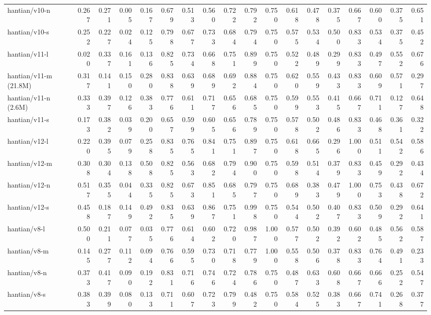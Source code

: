 \documentclass[border=2pt]{standalone}
\begin{document}
\begin{tabular}{lrrrrrrrrrrrrrrrrr}
hantian/v10-n & 0.267 & 0.271 & 0.005 & 0.167 & 0.679 & 0.513 & 0.560 & 0.722 & 0.792 & 0.750 & 0.618 & 0.478 & 0.375 & 0.667 & 0.600 & 0.375 & 0.651 \\
hantian/v10-s & 0.252 & 0.227 & 0.024 & 0.125 & 0.798 & 0.677 & 0.733 & 0.684 & 0.794 & 0.750 & 0.575 & 0.534 & 0.500 & 0.833 & 0.534 & 0.375 & 0.452 \\
hantian/v11-l & 0.020 & 0.337 & 0.161 & 0.136 & 0.825 & 0.734 & 0.668 & 0.751 & 0.899 & 0.750 & 0.522 & 0.489 & 0.299 & 0.833 & 0.497 & 0.552 & 0.676 \\
hantian/v11-m (21.8M) & 0.317 & 0.141 & 0.150 & 0.280 & 0.838 & 0.639 & 0.689 & 0.692 & 0.884 & 0.750 & 0.620 & 0.559 & 0.433 & 0.833 & 0.609 & 0.571 & 0.297 \\
hantian/v11-n (2.6M) & 0.333 & 0.397 & 0.126 & 0.383 & 0.776 & 0.611 & 0.717 & 0.656 & 0.685 & 0.750 & 0.599 & 0.553 & 0.415 & 0.667 & 0.711 & 0.127 & 0.648 \\
hantian/v11-s & 0.173 & 0.382 & 0.039 & 0.200 & 0.657 & 0.599 & 0.605 & 0.656 & 0.789 & 0.750 & 0.578 & 0.502 & 0.486 & 0.833 & 0.468 & 0.361 & 0.322 \\
hantian/v12-l & 0.220 & 0.395 & 0.079 & 0.258 & 0.835 & 0.765 & 0.841 & 0.751 & 0.897 & 0.750 & 0.618 & 0.665 & 0.296 & 1.000 & 0.511 & 0.542 & 0.586 \\
hantian/v12-m & 0.308 & 0.304 & 0.138 & 0.508 & 0.825 & 0.563 & 0.682 & 0.794 & 0.900 & 0.750 & 0.598 & 0.514 & 0.379 & 0.833 & 0.459 & 0.292 & 0.434 \\
hantian/v12-n & 0.517 & 0.355 & 0.044 & 0.335 & 0.825 & 0.673 & 0.851 & 0.685 & 0.797 & 0.750 & 0.689 & 0.383 & 0.479 & 1.000 & 0.753 & 0.438 & 0.672 \\
hantian/v12-s & 0.458 & 0.187 & 0.149 & 0.492 & 0.835 & 0.639 & 0.867 & 0.751 & 0.998 & 0.750 & 0.544 & 0.502 & 0.407 & 0.833 & 0.509 & 0.292 & 0.641 \\
hantian/v8-l & 0.500 & 0.211 & 0.077 & 0.035 & 0.776 & 0.614 & 0.602 & 0.720 & 0.987 & 1.000 & 0.577 & 0.502 & 0.392 & 0.602 & 0.485 & 0.562 & 0.587 \\
hantian/v8-m & 0.145 & 0.277 & 0.112 & 0.094 & 0.766 & 0.595 & 0.730 & 0.718 & 0.779 & 1.000 & 0.558 & 0.506 & 0.378 & 0.833 & 0.764 & 0.491 & 0.233 \\
hantian/v8-n & 0.373 & 0.417 & 0.090 & 0.192 & 0.831 & 0.716 & 0.746 & 0.724 & 0.786 & 0.750 & 0.487 & 0.633 & 0.608 & 0.667 & 0.666 & 0.252 & 0.547 \\
hantian/v8-s & 0.383 & 0.399 & 0.080 & 0.133 & 0.711 & 0.607 & 0.723 & 0.799 & 0.482 & 0.750 & 0.584 & 0.525 & 0.383 & 0.667 & 0.741 & 0.268 & 0.377 \\

\end{tabular}
\end{document}
